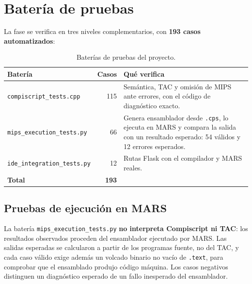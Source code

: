\documentclass[11pt,a4paper]{article}
\begin{document}
\section{Batería de pruebas}

La fase se verifica en tres niveles complementarios, con \textbf{193 casos
automatizados}:

\begin{table}[H]
\centering
\small
\begin{tabular}{@{}L{5.0cm}rL{7.6cm}@{}}
\toprule
\textbf{Batería} & \textbf{Casos} & \textbf{Qué verifica} \\
\midrule
\texttt{compiscript\_tests.cpp} & 115 & Semántica, TAC y omisión de MIPS ante
errores, con el código de diagnóstico exacto. \\
\texttt{mips\_execution\_tests.py} & 66 & Genera ensamblador desde
\texttt{.cps}, lo ejecuta en MARS y compara la salida con un resultado
esperado: 54 válidos y 12 errores esperados. \\
\texttt{ide\_integration\_tests.py} & 12 & Rutas Flask con el compilador y MARS
reales. \\
\midrule
\textbf{Total} & \textbf{193} & \\
\bottomrule
\end{tabular}
\caption{Baterías de pruebas del proyecto.}
\end{table}

\subsection{Pruebas de ejecución en MARS}

La batería \texttt{mips\_execution\_tests.py} \textbf{no interpreta Compiscript
ni TAC}: los resultados observados proceden del ensamblador ejecutado por MARS.
Las salidas esperadas se calcularon a partir de los programas fuente, no del
TAC, y cada caso válido exige además un volcado binario no vacío de
\texttt{.text}, para comprobar que el ensamblado produjo código máquina. Los
casos negativos distinguen un diagnóstico esperado de un fallo inesperado del
ensamblador.
\end{document}
